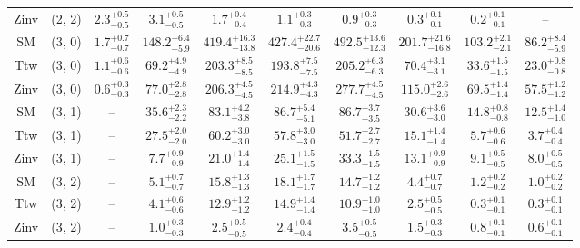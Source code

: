 \begin{table}[h!]
{\begin{tabular}{cccccccccc}
	Zinv & (2, 2) & $2.3^{+ 0.5 }_{- 0.5 }$ & $3.1^{+ 0.5 }_{- 0.5 }$ & $1.7^{+ 0.4 }_{- 0.4 }$ & $1.1^{+ 0.3 }_{- 0.3 }$ & $0.9^{+ 0.3 }_{- 0.3 }$ & $0.3^{+ 0.1 }_{- 0.1 }$ & $0.2^{+ 0.1 }_{- 0.1 }$ & -- \\[0.5ex] 
	SM & (3, 0) & $1.7^{+ 0.7 }_{- 0.7 }$ & $148.2^{+ 6.4 }_{- 5.9 }$ & $419.4^{+ 16.3 }_{- 13.8 }$ & $427.4^{+ 22.7 }_{- 20.6 }$ & $492.5^{+ 13.6 }_{- 12.3 }$ & $201.7^{+ 21.6 }_{- 16.8 }$ & $103.2^{+ 2.1 }_{- 2.1 }$ & $86.2^{+ 8.4 }_{- 5.9 }$ \\[0.5ex] 
	Ttw & (3, 0) & $1.1^{+ 0.6 }_{- 0.6 }$ & $69.2^{+ 4.9 }_{- 4.9 }$ & $203.3^{+ 8.5 }_{- 8.5 }$ & $193.8^{+ 7.5 }_{- 7.5 }$ & $205.2^{+ 6.3 }_{- 6.3 }$ & $70.4^{+ 3.1 }_{- 3.1 }$ & $33.6^{+ 1.5 }_{- 1.5 }$ & $23.0^{+ 0.8 }_{- 0.8 }$ \\[0.5ex] 
	Zinv & (3, 0) & $0.6^{+ 0.3 }_{- 0.3 }$ & $77.0^{+ 2.8 }_{- 2.8 }$ & $206.3^{+ 4.5 }_{- 4.5 }$ & $214.9^{+ 4.3 }_{- 4.3 }$ & $277.7^{+ 4.5 }_{- 4.5 }$ & $115.0^{+ 2.6 }_{- 2.6 }$ & $69.5^{+ 1.4 }_{- 1.4 }$ & $57.5^{+ 1.2 }_{- 1.2 }$ \\[0.5ex] 
	SM & (3, 1) & -- & $35.6^{+ 2.3 }_{- 2.2 }$ & $83.1^{+ 4.2 }_{- 3.8 }$ & $86.7^{+ 5.4 }_{- 5.1 }$ & $86.7^{+ 3.7 }_{- 3.5 }$ & $30.6^{+ 3.6 }_{- 3.0 }$ & $14.8^{+ 0.8 }_{- 0.8 }$ & $12.5^{+ 1.4 }_{- 1.0 }$ \\[0.5ex] 
	Ttw & (3, 1) & -- & $27.5^{+ 2.0 }_{- 2.0 }$ & $60.2^{+ 3.0 }_{- 3.0 }$ & $57.8^{+ 3.0 }_{- 3.0 }$ & $51.7^{+ 2.7 }_{- 2.7 }$ & $15.1^{+ 1.4 }_{- 1.4 }$ & $5.7^{+ 0.6 }_{- 0.6 }$ & $3.7^{+ 0.4 }_{- 0.4 }$ \\[0.5ex] 
	Zinv & (3, 1) & -- & $7.7^{+ 0.9 }_{- 0.9 }$ & $21.0^{+ 1.4 }_{- 1.4 }$ & $25.1^{+ 1.5 }_{- 1.5 }$ & $33.3^{+ 1.5 }_{- 1.5 }$ & $13.1^{+ 0.9 }_{- 0.9 }$ & $9.1^{+ 0.5 }_{- 0.5 }$ & $8.0^{+ 0.5 }_{- 0.5 }$ \\[0.5ex] 
	SM & (3, 2) & -- & $5.1^{+ 0.7 }_{- 0.7 }$ & $15.8^{+ 1.3 }_{- 1.3 }$ & $18.1^{+ 1.7 }_{- 1.7 }$ & $14.7^{+ 1.2 }_{- 1.2 }$ & $4.4^{+ 0.7 }_{- 0.7 }$ & $1.2^{+ 0.2 }_{- 0.2 }$ & $1.0^{+ 0.2 }_{- 0.2 }$ \\[0.5ex] 
	Ttw & (3, 2) & -- & $4.1^{+ 0.6 }_{- 0.6 }$ & $12.9^{+ 1.2 }_{- 1.2 }$ & $14.9^{+ 1.4 }_{- 1.4 }$ & $10.9^{+ 1.0 }_{- 1.0 }$ & $2.5^{+ 0.5 }_{- 0.5 }$ & $0.3^{+ 0.1 }_{- 0.1 }$ & $0.3^{+ 0.1 }_{- 0.1 }$ \\[0.5ex] 
	Zinv & (3, 2) & -- & $1.0^{+ 0.3 }_{- 0.3 }$ & $2.5^{+ 0.5 }_{- 0.5 }$ & $2.4^{+ 0.4 }_{- 0.4 }$ & $3.5^{+ 0.5 }_{- 0.5 }$ & $1.5^{+ 0.3 }_{- 0.3 }$ & $0.8^{+ 0.1 }_{- 0.1 }$ & $0.6^{+ 0.1 }_{- 0.1 }$ \\[0.5ex] 

\end{tabular}}
\end{table}
